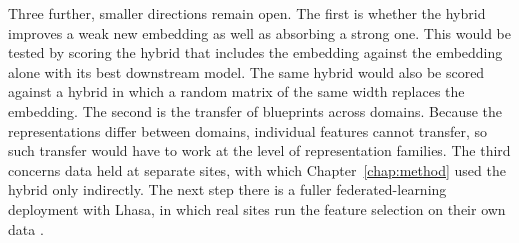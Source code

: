 Three further, smaller directions remain open. The first is whether the hybrid improves a weak new embedding as well as absorbing a strong one. This would be tested by scoring the hybrid that includes the embedding against the embedding alone with its best downstream model. The same hybrid would also be scored against a hybrid in which a random matrix of the same width replaces the embedding. The second is the transfer of blueprints across domains. Because the representations differ between domains, individual features cannot transfer, so such transfer would have to work at the level of representation families. The third concerns data held at separate sites, with which Chapter~\ref{chap:method} used the hybrid only indirectly. The next step there is a fuller federated-learning deployment with Lhasa, in which real sites run the feature selection on their own data \citep{McMahan2017}.

